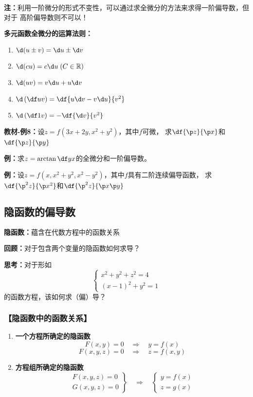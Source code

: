 {\bf 注：}利用一阶微分的形式不变性，可以通过求全微分的方法来求得一阶偏导数，但对于
高阶偏导数则不可以！

{\bf 多元函数全微分的运算法则：}
\begin{enumerate}[(1)]
  \setlength{\itemindent}{1cm}
  \item $\d(u\pm v)=\d u\pm \d v$
  \item $\d(cu)=c\d u\;(C\in\mathbb{R})$
  \item $\d(uv)=v\d u+u\d v$
  \item $\d\left(\df uv\right)=\df{u\d v-v\d u}{v^2}$
  \item $\d\left(\df 1v\right)=-\df{\d v}{v^2}$
\end{enumerate}

{\bf 教材-例8：}设$z=f(3x+2y,x^2+y^2)$，其中$f$可微，
求$\df{\p z}{\p x}$和$\df{\p z}{\p y}$

{\bf 例：}求$z=\arctan\df yx$的全微分和一阶偏导数。

{\bf 例：}设$z=f(x,x^2+y^2,x^2-y^2)$，其中$f$具有二阶连续偏导函数，
求$\df{\p^2 z}{\p x^2}$和$\df{\p^2 z}{\p x\p y}$

\subsection{隐函数的偏导数}

{\bf 隐函数：}蕴含在代数方程中的函数关系

{\bf 回顾：}对于包含两个变量的隐函数如何求导？

{\bf 思考：}对于形如
$$\left\{\begin{array}{l}
	  	x^2+y^2+z^2=4\\
	  	(x-1)^2+y^2=1
	  \end{array}\right.$$
的函数方程，该如何求（偏）导？

\subsubsection{【隐函数中的函数关系】}

\begin{enumerate}
  \setlength{\itemindent}{1cm}
  \item {\bf 一个方程所确定的隐函数} 
  $$F(x,y)=0 \quad \Rightarrow \quad y=f(x) $$
  $$F(x,y,z)=0 \quad \Rightarrow \quad z=f(x,y) $$
  \item {\bf 方程组所确定的隐函数} 
  $$\left.\begin{array}{l}
  	F(x,y,z)=0\\ G(x,y,z)=0
  \end{array}\right\} \quad \Rightarrow \quad 
  \left\{\begin{array}{l}
  	y=f(x)\\ z=g(x)
  \end{array}\right. $$
\end{enumerate}

